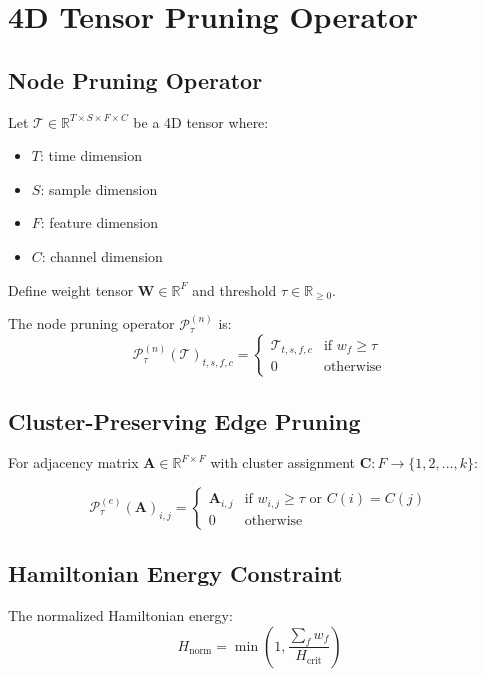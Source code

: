 
\section{4D Tensor Pruning Operator}

\subsection{Node Pruning Operator}
Let $\mathcal{T} \in \mathbb{R}^{T \times S \times F \times C}$ be a 4D tensor where:
\begin{itemize}
    \item $T$: time dimension
    \item $S$: sample dimension  
    \item $F$: feature dimension
    \item $C$: channel dimension
\end{itemize}

Define weight tensor $\mathbf{W} \in \mathbb{R}^{F}$ and threshold $\tau \in \mathbb{R}_{\geq 0}$.

The node pruning operator $\mathcal{P}_\tau^{(n)}$ is:
$$\mathcal{P}_\tau^{(n)}(\mathcal{T})_{t,s,f,c} = \begin{cases}
    \mathcal{T}_{t,s,f,c} & \text{if } w_f \geq \tau \\
    0 & \text{otherwise}
\end{cases}$$

\subsection{Cluster-Preserving Edge Pruning}
For adjacency matrix $\mathbf{A} \in \mathbb{R}^{F \times F}$ with cluster assignment $\mathbf{C}: F \rightarrow \{1,2,...,k\}$:

$$\mathcal{P}_\tau^{(e)}(\mathbf{A})_{i,j} = \begin{cases}
    \mathbf{A}_{i,j} & \text{if } w_{i,j} \geq \tau \text{ or } C(i) = C(j) \\
    0 & \text{otherwise}
\end{cases}$$

\subsection{Hamiltonian Energy Constraint}
The normalized Hamiltonian energy:
$$H_{\text{norm}} = \min\left(1, \frac{\sum_{f} w_f}{H_{\text{crit}}}\right)$$


